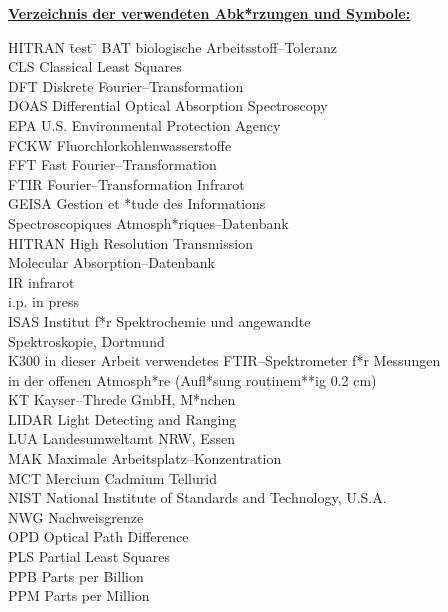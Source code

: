 \thispagestyle{empty}

\noindent
\underline{\bf Verzeichnis der verwendeten Abk*rzungen und Symbole:} \rm


\begin{tabbing}
HITRAN \quad \=test \=\kill
BAT \> biologische Arbeitsstoff--Toleranz\\
CLS \> Classical Least Squares\\
DFT \> Diskrete Fourier--Transformation\\
DOAS \> Differential Optical Absorption Spectroscopy\\
EPA \> U.S. Environmental Protection Agency\\
FCKW \> Fluorchlorkohlenwasserstoffe\\
FFT \> Fast Fourier--Transformation\\
FTIR \> Fourier--Transformation Infrarot\\
GEISA \> Gestion et *tude des  Informations\\
\> Spectroscopiques Atmosph*riques--Datenbank\\
HITRAN \> High Resolution Transmission\\
\> Molecular Absorption--Datenbank\\
IR \> infrarot\\
i.p. \> in press\\
ISAS \> Institut f*r Spektrochemie und angewandte\\
\> Spektroskopie, Dortmund\\
K300 \> in dieser Arbeit verwendetes FTIR--Spektrometer f*r Messungen\\
\> in der offenen Atmosph*re (Aufl*sung routinem**ig 0.2 cm)\\
KT \> Kayser--Threde GmbH, M*nchen\\
LIDAR \> Light Detecting and Ranging\\
LUA \> Landesumweltamt NRW, Essen\\
MAK \> Maximale Arbeitsplatz--Konzentration\\
MCT \> Mercium Cadmium Tellurid\\
NIST \> National Institute of Standards and Technology, U.S.A.\\
NWG \> Nachweisgrenze\\
OPD \> Optical Path Difference\\
PLS \> Partial Least Squares\\
PPB \> Parts per Billion\\
PPM \> Parts per Million\\

\end{tabbing}
